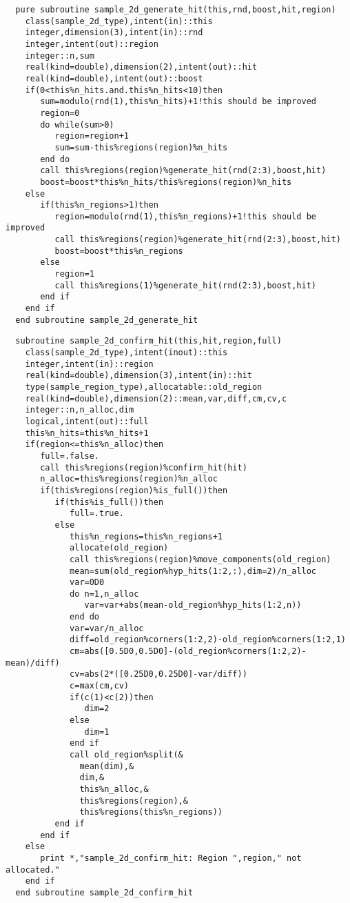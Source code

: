 \begin{Verbatim}
  pure subroutine sample_2d_generate_hit(this,rnd,boost,hit,region)
    class(sample_2d_type),intent(in)::this
    integer,dimension(3),intent(in)::rnd
    integer,intent(out)::region
    integer::n,sum
    real(kind=double),dimension(2),intent(out)::hit
    real(kind=double),intent(out)::boost
    if(0<this%n_hits.and.this%n_hits<10)then
       sum=modulo(rnd(1),this%n_hits)+1!this should be improved
       region=0
       do while(sum>0)
          region=region+1
          sum=sum-this%regions(region)%n_hits
       end do
       call this%regions(region)%generate_hit(rnd(2:3),boost,hit)
       boost=boost*this%n_hits/this%regions(region)%n_hits
    else
       if(this%n_regions>1)then
          region=modulo(rnd(1),this%n_regions)+1!this should be improved
          call this%regions(region)%generate_hit(rnd(2:3),boost,hit)
          boost=boost*this%n_regions
       else
          region=1
          call this%regions(1)%generate_hit(rnd(2:3),boost,hit)
       end if
    end if
  end subroutine sample_2d_generate_hit
\end{Verbatim}

\begin{Verbatim}
  subroutine sample_2d_confirm_hit(this,hit,region,full)
    class(sample_2d_type),intent(inout)::this
    integer,intent(in)::region
    real(kind=double),dimension(3),intent(in)::hit
    type(sample_region_type),allocatable::old_region
    real(kind=double),dimension(2)::mean,var,diff,cm,cv,c
    integer::n,n_alloc,dim 
    logical,intent(out)::full
    this%n_hits=this%n_hits+1
    if(region<=this%n_alloc)then
       full=.false.
       call this%regions(region)%confirm_hit(hit)
       n_alloc=this%regions(region)%n_alloc
       if(this%regions(region)%is_full())then
          if(this%is_full())then
             full=.true.
          else
             this%n_regions=this%n_regions+1
             allocate(old_region)
             call this%regions(region)%move_components(old_region)
             mean=sum(old_region%hyp_hits(1:2,:),dim=2)/n_alloc
             var=0D0
             do n=1,n_alloc
                var=var+abs(mean-old_region%hyp_hits(1:2,n))
             end do
             var=var/n_alloc
             diff=old_region%corners(1:2,2)-old_region%corners(1:2,1)
             cm=abs([0.5D0,0.5D0]-(old_region%corners(1:2,2)-mean)/diff)
             cv=abs(2*([0.25D0,0.25D0]-var/diff))
             c=max(cm,cv)
             if(c(1)<c(2))then
                dim=2
             else
                dim=1
             end if
             call old_region%split(&
               mean(dim),&
               dim,&
               this%n_alloc,&
               this%regions(region),&
               this%regions(this%n_regions))
          end if
       end if
    else
       print *,"sample_2d_confirm_hit: Region ",region," not allocated."
    end if
  end subroutine sample_2d_confirm_hit
\end{Verbatim}

